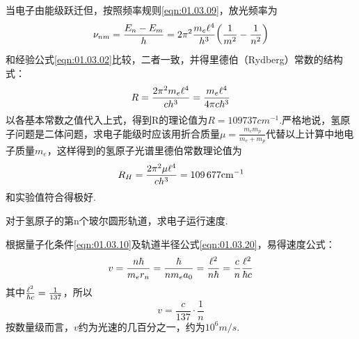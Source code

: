 当电子由能级跃迁但，按照频率规则\eqref{eqn:01.03.09}，放光频率为
\begin{equation}\label{eqn:01.03.21}
	\nu_{nm}=\frac{E_{n}-E_{m}}{h}=2\pi^{2}\frac{m_{e}\e^{4}}{h^{3}}\bigg(\frac{1}{m^{2}} -\frac{1}{n^{2}}\bigg)
\end{equation}
和经验公式\eqref{eqn:01.03.02}比较，二者一致，并得里德伯（Rydberg）常数的结构式：
\begin{equation}\label{eqn:01.03.22}
	R=\frac{2\pi^{2}m_{e}\e^{4}}{ch^{3}}=\frac{m_{e}\e^{4}}{4\pi c\hbar^{3}}
\end{equation}
以各基本常数之值代入上式，得到R的理论值为$R=\num{109737}\si{cm^{-1}}$.严格地说，氢原子问题是二体问题，求电子能级时应该用折合质量$\mu=\frac{m_{e}m_{p}}{m_{e}+m_{p}}$代替以上计算中地电子质量$m_{e}$，这样得到的氢原子光谱里德伯常数理论值为
\begin{equation}\label{eqn:01.03.23}
	R_{H}=\frac{2\pi^{2}\mu \e^{4}}{ch^{3}}=\num{109677} \si{cm^{-1}}
\end{equation}
和实验值符合得极好.

\example 对于氢原子的第n个玻尔圆形轨道，求电子运行速度.

\solution 根据量子化条件\eqref{eqn:01.03.10}及轨道半径公式\eqref{eqn:01.03.20}，易得速度公式：
\begin{equation*}
	v=\frac{n\hbar}{m_{e}r_{n}}=\frac{\hbar}{nm_{e}a_{0}}=\frac{\e^{2}}{n\hbar}=\frac{c}{n}\frac{\e^{2}}{\hbar c}
\end{equation*}\eqshort
其中$\frac{\e^{2}}{\hbar c}=\frac{1}{137}$，所以
\begin{equation}\label{eqn:01.03.24}
	v=\frac{c}{137}\cdot\frac{1}{n}
\end{equation}\eqnormal
按数量级而言，$v$约为光速的几百分之一，约为$10^{6}\si{m/s}$.
